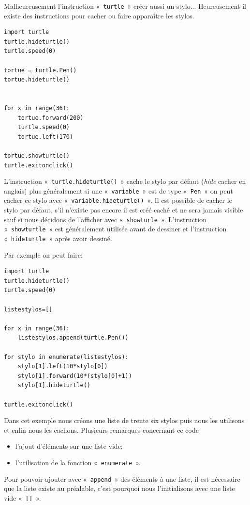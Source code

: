 Malheureusement l'instruction «~\texttt{turtle}~» créer aussi un stylo... Heureusement il existe des instructions pour cacher ou faire apparaître les stylos.

\begin{Verbatim}[frame=single,rulecolor=\color{mbleu}, label=à taper]
import turtle
turtle.hideturtle()
turtle.speed(0)

tortue = turtle.Pen()
tortue.hideturtle()


for x in range(36):
    tortue.forward(200)
    turtle.speed(0)
    tortue.left(170)

tortue.showturtle()    
turtle.exitonclick()
\end{Verbatim}

L'instruction «~\texttt{turtle.hideturtle()}~» cache le stylo par défaut (\emph{hide} cacher en anglais) plus généralement si une «~\texttt{variable}~»  est de type «~\texttt{Pen}~» on peut cacher ce stylo avec «~\texttt{variable.hideturtle()}~». Il est possible de cacher le stylo par défaut, s'il n'existe pas encore il est créé caché et ne sera jamais visible sauf si nous décidons de l'afficher avec «~\texttt{showturle}~». L'instruction  «~\texttt{showturtle}~» est généralement utilisée avant de dessiner et l'instruction «~\texttt{hideturtle}~» après avoir dessiné.

Par exemple on peut faire:
\begin{Verbatim}[frame=single,rulecolor=\color{mbleu}, label=à taper]
import turtle
turtle.hideturtle()
turtle.speed(0)

listestylos=[]

for x in range(36):
    listestylos.append(turtle.Pen())
    
for stylo in enumerate(listestylos): 
    stylo[1].left(10*stylo[0])
    stylo[1].forward(10*(stylo[0]+1))
    stylo[1].hideturtle()

turtle.exitonclick()
\end{Verbatim}

Dans cet exemple nous créons une liste de trente six stylos puis nous les utilisons et enfin nous les cachons.
Plusieurs remarques concernant ce code
\begin{itemize}
\item l'ajout d'éléments sur une liste vide;
\item l'utilisation de la fonction «~\texttt{enumerate}~».
\end{itemize}

Pour pouvoir ajouter avec «~\texttt{append}~» des éléments à une liste, il est nécessaire que la liste existe au préalable, c'est pourquoi nous l'initialisons avec une liste vide «~\texttt{[]}~».

